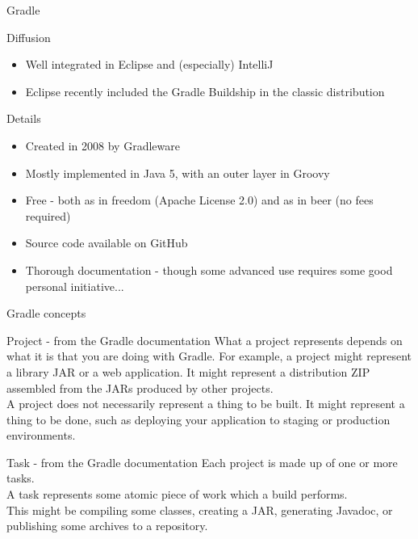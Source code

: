 \documentclass[presentation]{beamer}
\begin{document}
\begin{frame}{Gradle}
\begin{block}{Diffusion}
\begin{itemize}
			\item Well integrated in Eclipse and (especially) IntelliJ
			\item Eclipse recently included the Gradle Buildship in the classic distribution
		\end{itemize}
	\end{block}
	\begin{block}{Details}
		\begin{itemize}
			\item Created in 2008 by Gradleware
			\item Mostly implemented in Java 5, with an outer layer in Groovy
			\item Free - both as in freedom (Apache License 2.0) and as in beer (no fees required)
			\item Source code available on GitHub
			\item Thorough documentation - though some advanced use requires some good personal initiative...
		\end{itemize}
	\end{block}
\end{frame}

\begin{frame}[fragile]{Gradle concepts}
	\begin{block}{Project - from the Gradle documentation}
			What a project represents depends on what it is that you are doing with Gradle. For example, a project might represent a library JAR or a web application. It might represent a distribution ZIP assembled from the JARs produced by other projects. \\
			A project does not necessarily represent a thing to be built.
			It might represent a thing to be done, such as deploying your application to staging or production environments.
	\end{block}
	\begin{block}{Task - from the Gradle documentation}
			Each project is made up of one or more tasks. \\
			A task represents some atomic piece of work which a build performs.\\
			This might be compiling some classes, creating a JAR, generating Javadoc, or publishing some archives to a repository.
	\end{block}
\end{frame}
\end{document}
